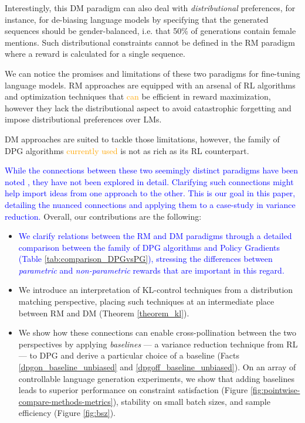 Interestingly, this DM paradigm can also deal with \emph{distributional} preferences, for instance, for de-biasing language models by specifying that the generated sequences should be gender-balanced, i.e. that 50\% of generations contain female mentions. Such distributional constraints cannot be defined in the RM paradigm where a reward is calculated for a single sequence. 

We can notice the promises and limitations of these two paradigms for fine-tuning language models. RM approaches are equipped with an arsenal of RL algorithms and optimization techniques that \textcolor{orange}{can}
be efficient in reward maximization, however they lack the distributional aspect to avoid catastrophic forgetting and impose distributional  preferences over LMs. 

DM approaches are suited to tackle those limitations, however, the family of DPG algorithms 
\textcolor{orange}{currently used} is not as rich as its RL counterpart.

\textcolor{blue}{While the connections between these two seemingly distinct paradigms have been noted \citep{opt-rl-arxiv-2019,rl_kl_penalties}, they have not been explored in detail. Clarifying such connections might help import ideas from one approach to the other. This is our goal in this paper, detailing the nuanced connections and applying them to a case-study in variance reduction.} Overall, our contributions are the following:

\begin{itemize}[leftmargin=15px]
    \itemsep0.2em 
    \item  \textcolor{blue}{We clarify relations between the RM and DM paradigms through a detailed comparison between the family of DPG algorithms and Policy Gradients (Table \ref{tab:comparison_DPGvsPG}), stressing the differences between \emph{parametric} and \emph{non-parametric} rewards that are important in this regard.}  

    \item We introduce an interpretation of KL-control techniques from a distribution matching perspective, placing such techniques at an intermediate place between RM and DM (Theorem \ref{theorem_kl}).

    \item We show how these connections can enable cross-pollination between the two perspectives by applying \emph{baselines} --- a variance reduction technique from RL --- to DPG and derive a particular choice of a baseline (Facts \ref{dpgon_baseline_unbiased} and \ref{dpgoff_baseline_unbiased}). On an array of controllable language generation experiments, we show that adding baselines leads to superior performance on constraint satisfaction (Figure \ref{fig:pointwise-compare-methods-metrics}), stability on small batch sizes, and sample efficiency (Figure \ref{fig:bsz}). 
\end{itemize}

